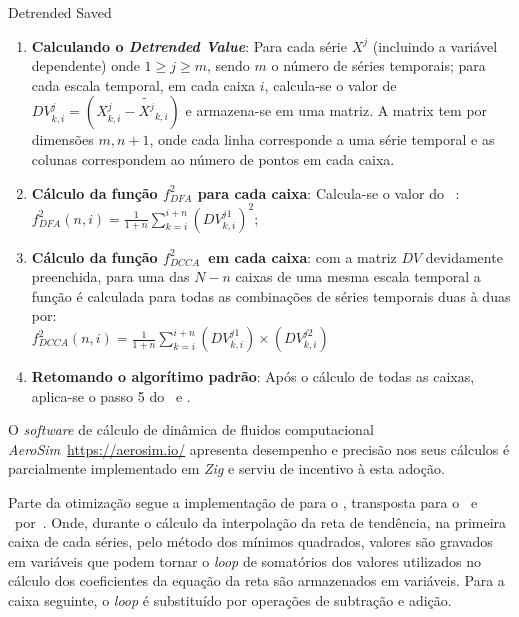 \begin{algorithm} \caption{Detrended Saved} \label{alg:det_reused}
  \begin{enumerate}[label=4.\alph*]
      \item \textbf{Calculando o \emph{Detrended Value}}: Para cada série $X^{j}$ (incluindo a variável dependente) onde  $1 \ge j \ge m$, sendo $m$ o número de séries temporais; para cada escala temporal, em cada caixa $i$, calcula-se o valor de $DV^{j}_{k,i} = (X^{j}_{k,i}-\widetilde{X^{j}}_{k, i})$ e armazena-se em uma matriz. A matrix tem por dimensões $m, n+1$, onde cada linha corresponde a uma série temporal e as colunas correspondem ao número de pontos em cada caixa.
      \item \textbf{Cálculo da função $f_{DFA}^{2}$ para cada caixa}: Calcula-se o valor do \dfa~:\\[10pt]
          $f_{DFA}^{2}(n, i) = \frac{1}{1+n} \sum_{k=i}^{i + n}(DV^{j1}_{k,i})^{2}$;
      \item \textbf{Cálculo da função $f_{DCCA}^{2}$~em cada caixa}: com a matriz $DV$ devidamente preenchida, para uma das $N - n$ caixas de uma mesma escala temporal a função é calculada para todas as combinações de séries temporais duas à duas por:\\[10pt]
          $f_{DCCA}^{2}(n, i) = \frac{1}{1+n} \sum_{k=i}^{i + n}(DV^{j1}_{k,i}) \times (DV^{j2}_{k,i})$
      \item \textbf{Retomando o algorítimo padrão}: Após o cálculo de todas as caixas, aplica-se o passo 5 do \dfa~e \dcca. 
  \end{enumerate}
  \end{algorithm}

O \emph{software} de cálculo de dinâmica de fluidos computacional \emph{AeroSim}~\url{https://aerosim.io/} apresenta desempenho e precisão nos seus cálculos \cite{romanusViableFrameworkWind2023, lugariniLargeEddySimulations2024} é parcialmente implementado em \emph{Zig} e serviu de incentivo à esta adoção.

Parte da otimização segue a implementação de  para o \dfa, transposta para o \dcca~e \pdcca~por~. Onde, durante o cálculo da interpolação da reta de tendência, na primeira caixa de cada séries, pelo método dos mínimos quadrados, valores são gravados em variáveis que podem tornar o \emph{loop} de somatórios dos valores utilizados no cálculo dos coeficientes da equação da reta são armazenados em variáveis. Para a caixa seguinte, o \emph{loop} é substituído por operações de subtração e adição.



